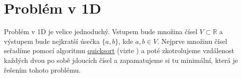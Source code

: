 \chapter{Problém v 1D}
\label{chap:problem_1D}
Problém v 1D je velice jednoduchý. Vstupem bude množina čísel $V \subset \mathbb{R}$ a výstupem bude nejkratší úsečka $\{a, b\}$, kde $ a, b \in V$. Nejprve množinu čísel seřadíme pomocí algoritmu \href{https://doi.org/10.1093/comjnl/5.1.10}{quicksort} (vizte \autocite{10.1093/comjnl/5.1.10}) a poté zkotrolujeme vzdálenost každých dvou po sobě jdoucích čísel a zapamatujeme si tu minimální, která je řešením tohoto problému.  


